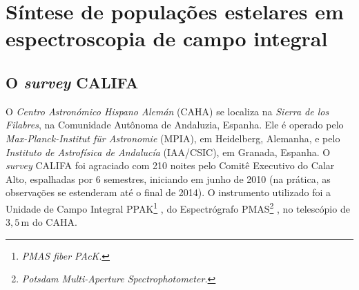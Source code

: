 


\chapter{Síntese de populações estelares em espectroscopia de campo integral}
\label{sec:ifs}


\section{O {\em survey} CALIFA}

O {\em Centro Astronómico Hispano Alemán} (CAHA) se localiza na {\em Sierra de
los Filabres}, na Comunidade Autônoma de Andaluzia, Espanha. Ele é operado pelo
{\em Max-Planck-Institut für Astronomie} (MPIA), em Heidelberg, Alemanha, e pelo
{\em Instituto de Astrofísica de Andalucía} (IAA/CSIC), em Granada, Espanha. O
{\em survey} CALIFA foi agraciado com 210 noites pelo Comitê Executivo do Calar
Alto, espalhadas por 6 semestres, iniciando em junho de 2010 (na prática, as
observações se estenderam até o final de 2014). O instrumento utilizado foi a
Unidade de Campo Integral PPAK\footnote{{\em PMAS fiber PAcK}.}
\citep{Kelz2006}, do Espectrógrafo PMAS\footnote{{\em Potsdam Multi-Aperture
Spectrophotometer.}} \citep{Roth2005, Roth2010}, no telescópio de
$3,5\,\mathrm{m}$ do CAHA.

